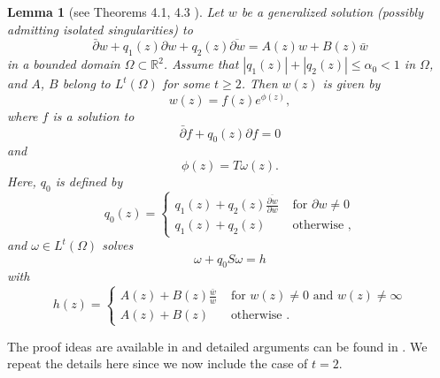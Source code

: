 \documentclass[12pt,reqno]{amsart}
\theoremstyle{plain}
\newtheorem{lem}{Lemma}
\theoremstyle{definition}
\newcommand{\om}{\omega}
\newcommand{\Om}{\Omega}
\newcommand{\ol}{\overline}
\newcommand{\iny}{\infty}
\newcommand{\del}{ \partial}
\newcommand{\su}{\subset}
\newcommand{\abs}[1]{\left\vert#1\right\vert}
\newcommand{\pr}[1]{\left( #1 \right) }
\newcommand{\R}{\ensuremath{\mathbb{R}}}
\begin{document}
\begin{lem}[see Theorems 4.1, 4.3 \cite{Boj09}]
Let $w$ be a generalized solution (possibly admitting isolated singularities) to
\begin{equation*}
\bar \del w + q_1\pr{z} \del w + q_2\pr{z} \ol{\del w} = A\pr{z} w + B\pr{z} \bar w
\end{equation*}
in a bounded domain $\Omega \su \R^2$.
Assume that $\abs{q_1\pr{z}} + \abs{q_2\pr{z}} \le  \alpha_0 < 1$ in $\Om$, and $A$, $B$ belong to $L^t\pr{\Om}$ for some $t \ge 2$.
Then $w\pr{z}$ is given by
$$w\pr{z}= f\pr{z} e^{\phi\pr{z}},$$
where $f$ is a solution to
$$\bar \del f + q_0\pr{z} \del f = 0$$
and
$$\phi\pr{z} = T{\om}\pr{z}.$$
Here, $q_0$ is defined by
\begin{equation}
\label{q0}
q_0\pr{z} = \left\{\begin{array}{ll} 
q_1\pr{z} + q_2\pr{z} \frac{\ol{\del w}}{\del w} & \text{ for } \del w \ne 0  \\  
q_1\pr{z} + q_2\pr{z} & \text{ otherwise },
\end{array} \right.
\end{equation}
and $\om \in L^t\pr{\Om}$ solves 
\begin{equation}
\om + q_0 S \om = h
\label{intEq}
\end{equation}
with
$$h\pr{z} = \left\{\begin{array}{ll} 
A\pr{z} + B\pr{z} \frac{\bar w}{w} & \text{ for } w\pr{z} \ne 0 \text{ and } w\pr{z} \ne \iny \\  
A\pr{z} + B\pr{z} & \text{ otherwise }.
\end{array}\right.$$
\label{simPrinc}
\end{lem}

The proof ideas are available in \cite{Boj09} and detailed arguments can be found in \cite{DKW17}.
We repeat the details here since we now include the case of $t = 2$.
\end{document}
